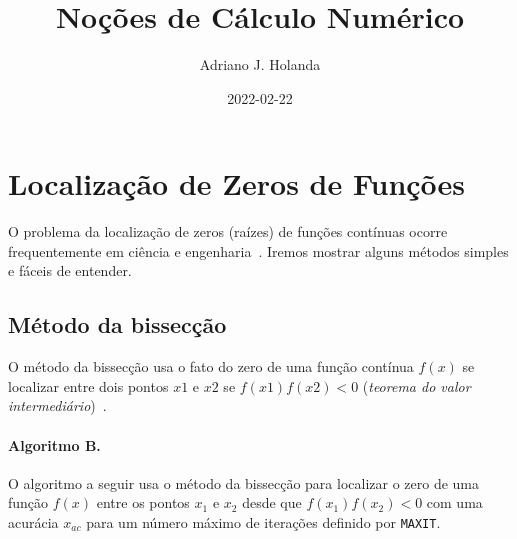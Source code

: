 \documentclass{article}
\begin{document}
\title{Noções de Cálculo Numérico}
\author{Adriano J. Holanda}
\date{2022-02-22}
\maketitle

\section*{Localização de Zeros de Funções}

O problema da localização de zeros (raízes) 
de funções contínuas ocorre frequentemente 
em ciência e engenharia~\cite{hamming}.
Iremos mostrar alguns métodos simples 
e fáceis de entender.

\subsection*{Método da bissecção}

O método da bissecção usa o fato do zero de uma 
função contínua $f(x)$ se localizar entre dois 
pontos $x1$ e $x2$ se $f(x1)f(x2)<0$ 
({\it teorema do valor intermediário\/})~\cite{numrec}.

\paragraph{Algoritmo B.}
O algoritmo a seguir usa o método da bissecção para 
localizar o zero de uma função $f(x)$ 
entre os pontos $x_1$ e $x_2$ desde que $f(x_1)f(x_2)<0$ 
com uma acurácia $x_{ac}$ para um número máximo 
de iterações definido por {\tt MAXIT}.
\end{document}
